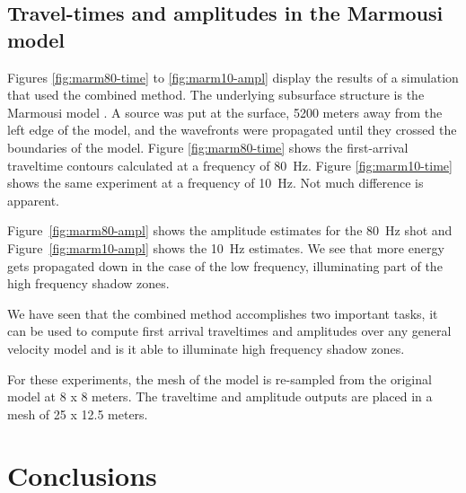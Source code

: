 \subsection{Travel-times and amplitudes in the Marmousi model}





Figures \ref{fig:marm80-time} to \ref{fig:marm10-ampl} display 
the results of a simulation that used the combined 
method. The underlying subsurface structure is the 
Marmousi model \cite[]{Versteeg}.
A source was put at the surface, 5200 meters away from the left edge
of the model, and the wavefronts were
propagated until they crossed the boundaries of the model.
Figure \ref{fig:marm80-time}
shows the first-arrival traveltime contours calculated at a frequency
of 80~Hz. Figure \ref{fig:marm10-time} shows the same experiment at
a frequency of 10~Hz. Not much difference is apparent.

Figure~\ref{fig:marm80-ampl} shows the amplitude estimates for the 80~Hz
shot and Figure~\ref{fig:marm10-ampl} shows the 10~Hz estimates. We see
that more energy gets propagated down in the case of the low
frequency, illuminating part of the high frequency shadow zones.

We have seen that the combined method accomplishes two important tasks,
it can be used to compute first arrival traveltimes and amplitudes 
over any general velocity model and is it able to illuminate high
frequency shadow zones.

For these experiments, the mesh of the model is re-sampled
from the original model at 8 x 8 meters. The traveltime
and amplitude outputs are placed in a mesh of 25 x 12.5 meters.

\section{Conclusions}

